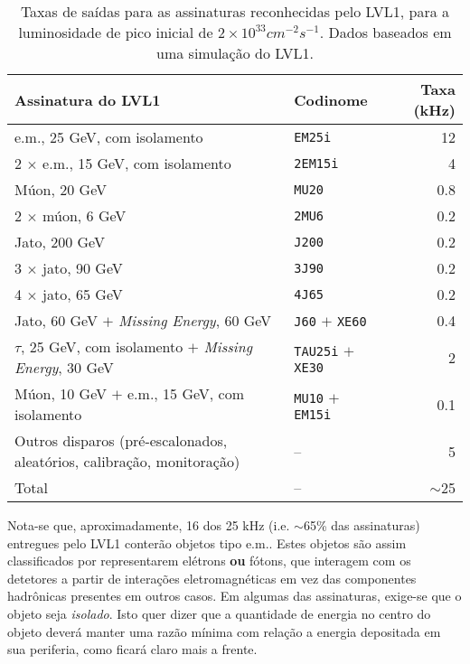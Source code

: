 \begin{table}
\caption{Taxas de saídas para as assinaturas reconhecidas pelo LVL1,
para a luminosidade de pico inicial de $2\times10^{33}cm^{-2}s^{-1}$. Dados
baseados em uma simulação do LVL1.}
\label{tab:l1-rates}
\begin{center}
\begin{sideways}
\begin{tabular}{|l|l|r|}
\hline
\textbf{Assinatura do LVL1} & \textbf{Codinome} & \textbf{Taxa (kHz)} \\ \hline
e.m., 25 GeV, com isolamento & \texttt{EM25i} & 12 \\ \hline
2 $\times$ e.m., 15 GeV, com isolamento & \texttt{2EM15i} & 4 \\ \hline
Múon, 20 GeV & \texttt{MU20} & 0.8 \\ \hline
2 $\times$ múon, 6 GeV & \texttt{2MU6} & 0.2 \\ \hline
Jato, 200 GeV & \texttt{J200} & 0.2 \\ \hline
3 $\times$ jato, 90 GeV & \texttt{3J90} & 0.2 \\ \hline
4 $\times$ jato, 65 GeV & \texttt{4J65} & 0.2 \\ \hline
Jato, 60 GeV $+$ \textit{Missing Energy}, 60 GeV & \texttt{J60} $+$
\texttt{XE60} & 0.4 \\ \hline
$\tau$, 25 GeV, com isolamento $+$ \textit{Missing Energy}, 30 GeV &
\texttt{TAU25i} $+$ \texttt{XE30} & 2 \\
\hline
Múon, 10 GeV $+$ e.m., 15 GeV, com isolamento & \texttt{MU10} $+$ \texttt{EM15i} & 0.1 \\ \hline
Outros disparos (pré-escalonados, aleatórios, calibração, monitoração) & -- & 5 \\
\hline
Total & -- & $\sim$25 \\ \hline
\end{tabular}
\end{sideways}
\end{center}
\end{table}

Nota-se que, aproximadamente, 16 dos 25 kHz (i.e. $\sim$65\% das assinaturas)
entregues pelo LVL1 conterão objetos tipo e.m.. Estes objetos são assim
classificados por representarem elétrons \textbf{ou} fótons, que interagem com
os detetores a partir de interações eletromagnéticas em vez das componentes
hadrônicas presentes em outros casos. Em algumas das assinaturas, exige-se que
o objeto seja \emph{isolado}. Isto quer dizer que a quantidade de energia no
centro do objeto deverá manter uma razão mínima com relação a energia
depositada em sua periferia, como ficará claro mais a frente.

